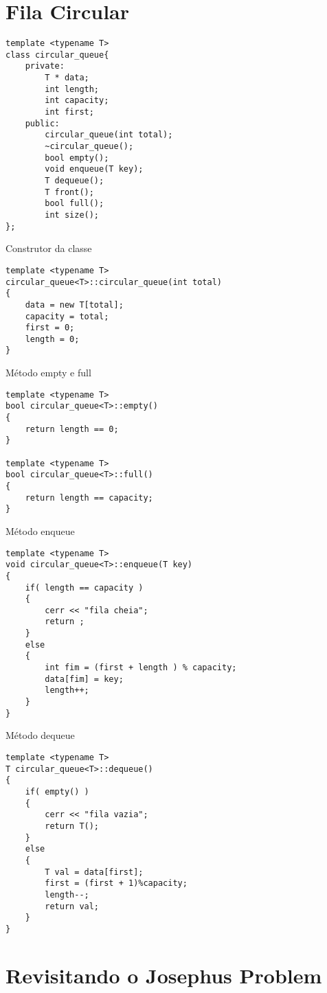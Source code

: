 \section{Fila Circular}
\label{sec::circular_ queue}

\begin{verbatim}
template <typename T> 
class circular_queue{
    private:
        T * data;
        int length;
        int capacity;
        int first;     
    public:
        circular_queue(int total);
        ~circular_queue();
        bool empty();
        void enqueue(T key);
        T dequeue();
        T front();
        bool full();
        int size();
};
\end{verbatim}

Construtor da classe
\begin{verbatim}
template <typename T> 
circular_queue<T>::circular_queue(int total)
{
    data = new T[total];
    capacity = total;
    first = 0;
    length = 0;
}
\end{verbatim}

Método empty e full
\begin{verbatim}
template <typename T> 
bool circular_queue<T>::empty()
{
    return length == 0;
}

template <typename T> 
bool circular_queue<T>::full()
{
    return length == capacity;
}

\end{verbatim}

Método enqueue
\begin{verbatim}
template <typename T> 
void circular_queue<T>::enqueue(T key)
{
    if( length == capacity )
    {
        cerr << "fila cheia";
        return ;
    }
    else
    {
        int fim = (first + length ) % capacity;
        data[fim] = key;
        length++;
    }
}
\end{verbatim}


Método dequeue
\begin{verbatim}
template <typename T> 
T circular_queue<T>::dequeue()
{
    if( empty() )
    {
        cerr << "fila vazia";
        return T();
    }
    else
    {
        T val = data[first];
        first = (first + 1)%capacity;
        length--;
        return val;
    }
}

\end{verbatim}

\section{Revisitando o Josephus Problem}


